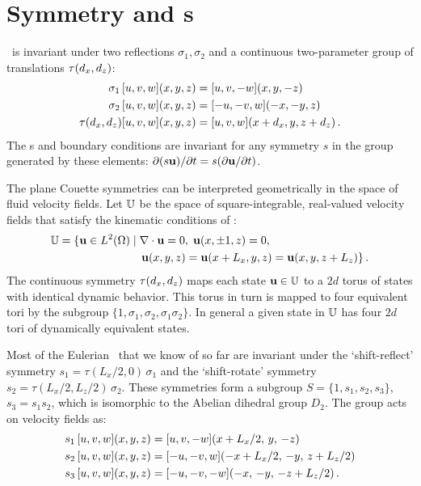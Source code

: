 \section{Symmetry and \stagp s}
\label{JHsec:4/28}

\PCf\ is invariant under two reflections $\sigma_1,\sigma_2$ and a
continuous two-parameter group of translations $\tau(d_x, d_z)$:
\begin{align}
\sigma_1 \, [u,v,w](x,y,z) &= [u, v,-w](x,y,-z) \nonumber \\
\sigma_2 \, [u,v,w](x,y,z) &= [-u,-v,w](-x,-y,z)  \label{reflSfit1}\\
\tau(d_x, d_z)[u,v,w](x,y,z) &= [u,v,w](x+d_x,y,z+d_z) \nonumber\,.
\end{align}
The \NSe s and boundary conditions are invariant for any symmetry $s$
in the group generated by these elements:
$\partial (s {\bf u}) / \partial t = s (\partial {\bf u} / \partial t)$.

The plane Couette symmetries can be interpreted geometrically in the space of
fluid velocity fields. Let $\mathbb{U}$ be the space of
square-integrable, real-valued velocity fields that satisfy the kinematic
conditions of \pCf:
\begin{align}
 \bbU  &= \{\bu \in L^2(\Omega) \; | \; \grad \cdot \bu = 0,
               \; \bu(x, \pm 1, z) = 0, \notag  \\
         &\phantom{=} {} \qquad \qquad \qquad \; \; %
          \bu(x, y, z) = \bu(x+L_x, y, z) = \bu(x, y, z + L_z)\}  \,.
\end{align} 
The continuous symmetry $\tau(d_x, d_z)$ maps each state
${\bf u} \in \mathbb{U}$ to a $2d$ torus of states with identical dynamic
behavior. This torus in turn is mapped to four equivalent tori by
the subgroup $\{1,\sigma_1,\sigma_2, \sigma_1 \sigma_2\}$. In
general a given state in $\mathbb{U}$ has four $2d$ tori of dynamically
equivalent states.

Most of the Eulerian \eqva\ that we know of so far
are invariant under the `shift-reflect' symmetry
$s_1 = \tau(L_x/2,0) \, \sigma_1$ and the `shift-rotate' symmetry
$s_2 = \tau(L_x/2,L_z/2) \, \sigma_2$.  These symmetries form a subgroup
$S = \{1, s_1, s_2, s_3\}$, $s_3 = s_1 s_2$, which is isomorphic to
the Abelian dihedral group $D_2$. The group acts on velocity fields
as:
\begin{align}
s_1 \, [u, v, w](x,y,z) &= [u, v, -w](x+L_x/2,\, y,\, -z) \nonumber \\
s_2 \, [u, v, w](x,y,z) &= [-u, -v, w](-x+L_x/2,\,-y,\,z+L_z/2) \label{shiftRot} \\
s_3 \, [u, v, w](x,y,z) &= [-u,-v,-w](-x,\, -y,\, -z+L_z/2) \nonumber \,.
\end{align}

